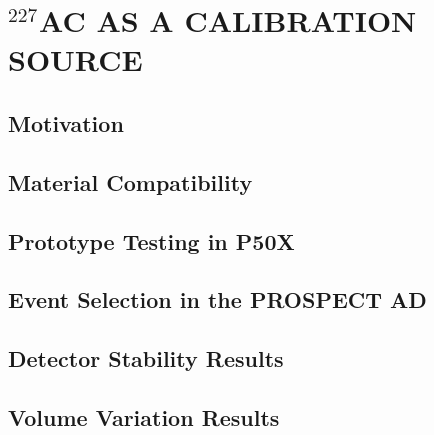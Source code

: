 \chapter{\uppercase{$^{227}$Ac as a Calibration Source}}

\section{Motivation}

\section{Material Compatibility}

\section{Prototype Testing in P50X}

\section{Event Selection in the PROSPECT AD}

\section{Detector Stability Results}

\section{Volume Variation Results}

